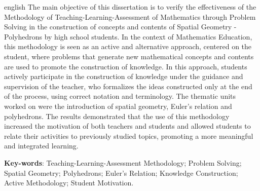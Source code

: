 
\begin{resumo}[Abstract]
	\begin{otherlanguage*}{english}
		 The main objective of this dissertation is to verify the effectiveness of the Methodology of Teaching-Learning-Assessment of Mathematics through Problem Solving in the construction of concepts and contents of Spatial Geometry - Polyhedrons by high school students. In the context of Mathematics Education, this methodology is seen as an active and alternative approach, centered on the student, where problems that generate new mathematical concepts and contents are used to promote the construction of knowledge. In this approach, students actively participate in the construction of knowledge under the guidance and supervision of the teacher, who formalizes the ideas constructed only at the end of the process, using correct notation and terminology. The thematic units worked on were the introduction of spatial geometry, Euler's relation and polyhedrons. The results demonstrated that the use of this methodology increased the motivation of both teachers and students and allowed students to relate their activities to previously studied topics, promoting a more meaningful and integrated learning.
		
		\vspace{\onelineskip}
		
		\noindent
		\textbf{Key-words}: Teaching-Learning-Assessment Methodology; Problem Solving; Spatial Geometry; Polyhedrons; Euler's Relation; Knowledge Construction; Active Methodology; Student Motivation.
	\end{otherlanguage*}
\end{resumo}
